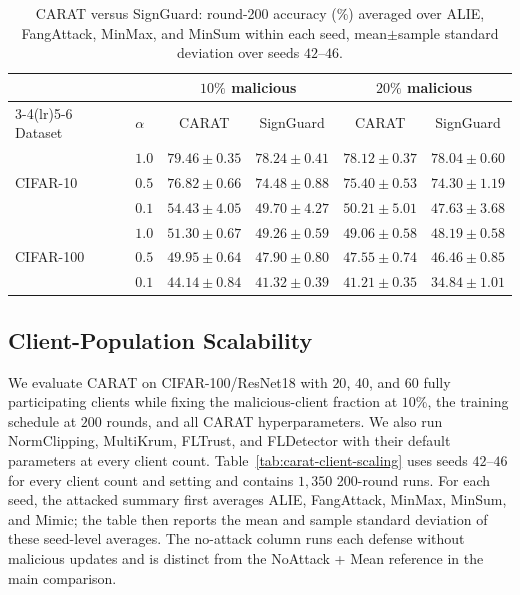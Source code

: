 \begin{table}[!htbp]
  \centering
  \caption{CARAT versus SignGuard: round-200 accuracy (\%) averaged over ALIE, FangAttack, MinMax, and MinSum within each seed, mean$\pm$sample standard deviation over seeds $42$--$46$.}
  \label{tab:signguard}
  \small
  \setlength{\tabcolsep}{4pt}
  \begin{tabular}{llcccc}
  \toprule
  & & \multicolumn{2}{c}{$10\%$ malicious} & \multicolumn{2}{c}{$20\%$ malicious} \\
  \cmidrule(lr){3-4}\cmidrule(lr){5-6}
  Dataset & $\alpha$ & CARAT & SignGuard & CARAT & SignGuard \\
  \midrule
  \multirow{3}{*}{CIFAR-10} & $1.0$ & $79.46\pm0.35$ & $78.24\pm0.41$ & $78.12\pm0.37$ & $78.04\pm0.60$ \\
  & $0.5$ & $76.82\pm0.66$ & $74.48\pm0.88$ & $75.40\pm0.53$ & $74.30\pm1.19$ \\
  & $0.1$ & $54.43\pm4.05$ & $49.70\pm4.27$ & $50.21\pm5.01$ & $47.63\pm3.68$ \\
  \midrule
  \multirow{3}{*}{CIFAR-100} & $1.0$ & $51.30\pm0.67$ & $49.26\pm0.59$ & $49.06\pm0.58$ & $48.19\pm0.58$ \\
  & $0.5$ & $49.95\pm0.64$ & $47.90\pm0.80$ & $47.55\pm0.74$ & $46.46\pm0.85$ \\
  & $0.1$ & $44.14\pm0.84$ & $41.32\pm0.39$ & $41.21\pm0.35$ & $34.84\pm1.01$ \\
  \bottomrule
  \end{tabular}
\end{table}

\FloatBarrier
\subsection{Client-Population Scalability}
\label{sec:appendix-scalability}

We evaluate CARAT on CIFAR-100/ResNet18 with $20$, $40$, and $60$ fully participating clients while fixing the malicious-client fraction at $10\%$, the training schedule at $200$ rounds, and all CARAT hyperparameters. We also run NormClipping, MultiKrum, FLTrust, and FLDetector with their default parameters at every client count. Table~\ref{tab:carat-client-scaling} uses seeds $42$--$46$ for every client count and setting and contains $1{,}350$ 200-round runs. For each seed, the attacked summary first averages ALIE, FangAttack, MinMax, MinSum, and Mimic; the table then reports the mean and sample standard deviation of these seed-level averages. The no-attack column runs each defense without malicious updates and is distinct from the NoAttack + Mean reference in the main comparison.

